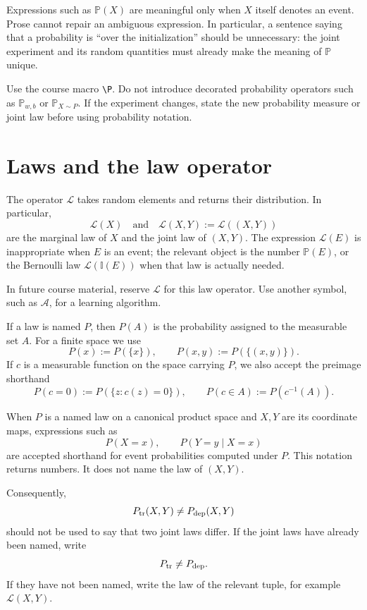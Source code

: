 \documentclass[11pt]{article}
\newcommand{\I}{\mathbb I}
\renewcommand{\P}{\mathbb P}
\newcommand{\Law}{\mathcal L}
\begin{document}
Expressions such as \(\P(X)\) are meaningful only when \(X\) itself denotes
an event. Prose cannot repair an ambiguous expression. In particular, a
sentence saying that a probability is ``over the initialization'' should be
unnecessary: the joint experiment and its random quantities must already make
the meaning of \(\P\) unique.

Use the course macro \verb|\P|. Do not introduce decorated probability
operators such as \(\P_{w,b}\) or \(\P_{X\sim P}\). If the experiment changes,
state the new probability measure or joint law before using probability
notation.

\section{Laws and the law operator}

The operator \(\Law\) takes random elements and returns their distribution.
In particular,
\[
 \Law(X)
 \quad\text{and}\quad
 \Law(X,Y):=\Law((X,Y))
\]
are the marginal law of \(X\) and the joint law of \((X,Y)\). The expression
\(\Law(E)\) is inappropriate when \(E\) is an event; the relevant object is
the number \(\P(E)\), or the Bernoulli law \(\Law(\I(E))\) when that law is
actually needed.

In future course material, reserve \(\mathcal L\) for this law operator. Use
another symbol, such as \(\mathcal A\), for a learning algorithm.

If a law is named \(P\), then \(P(A)\) is the probability assigned to the
measurable set \(A\). For a finite space we use
\begin{equation}
 P(x):=P(\{x\}),
 \qquad
 P(x,y):=P(\{(x,y)\}).
 \label{eq:finite-mass}
\end{equation}
If \(c\) is a measurable function on the space carrying \(P\), we also accept
the preimage shorthand
\[
 P(c=0):=P(\{z:c(z)=0\}),
 \qquad
 P(c\in A):=P(c^{-1}(A)).
\]

When \(P\) is a named law on a canonical product space and \(X,Y\) are its
coordinate maps, expressions such as
\[
 P(X=x),
 \qquad
 P(Y=y\mid X=x)
\]
are accepted shorthand for event probabilities computed under \(P\). This
notation returns numbers. It does not name the law of \((X,Y)\).

Consequently,
\[
 P_{\rm tr}(X,Y)\ne P_{\rm dep}(X,Y)
\]
should not be used to say that two joint laws differ. If the joint laws have
already been named, write
\[
 P_{\rm tr}\ne P_{\rm dep}.
\]
If they have not been named, write the law of the relevant tuple, for example
\(\Law(X,Y)\).
\end{document}
